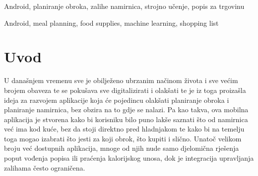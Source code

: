 \documentclass[diplomskirad]{fer}
\begin{document}
\begin{kljucnerijeci}
  Android, planiranje obroka, zalihe namirnica, strojno učenje, popis za trgovinu
\end{kljucnerijeci}


\begin{abstract}
  This master's thesis describes an application developed for nutrition management and meal planning. The purpose of the application is to improve meal planning and encourage healthier eating habits by enabling users to keep track of food items and organize their meals more efficiently. Using the application, users can independently plan meals for upcoming days based on the available ingredients, create shopping lists, and manage their food inventory. The thesis also presents a comparison of meal recipe recommendations obtained using a machine learning algorithm and recommendations based on a heuristic approach. Furthermore, it describes the implementation of the application, the method used for synchronizing user data across multiple devices, and the conducted unit and functional tests.

\end{abstract}

\begin{keywords}
  Android, meal planning, food supplies, machine learning, shopping list
\end{keywords}


\tableofcontents


\chapter{Uvod}
\label{pog:uvod}

U današnjem vremenu sve je obilježeno ubrzanim načinom života i sve većim brojem obaveza te se pokušava sve digitalizirati i olakšati te je iz toga proizašla ideja za razvojem aplikacije koja će pojedincu olakšati planiranje obroka i planiranje namirnica, bez obzira na to gdje se nalazi. Pa kao takva, ova mobilna aplikacija je stvorena kako bi korisniku bilo puno lakše saznati što od namirnica već ima kod kuće, bez da stoji direktno pred hladnjakom te kako bi na temelju toga mogao izabrati što jesti za koji obrok, što kupiti i slično. Unatoč velikom broju već dostupnih aplikacija, mnoge od njih nude samo djelomična rješenja poput vođenja popisa ili praćenja kalorijskog unosa, dok je integracija upravljanja zalihama često ograničena. 
\end{document}
